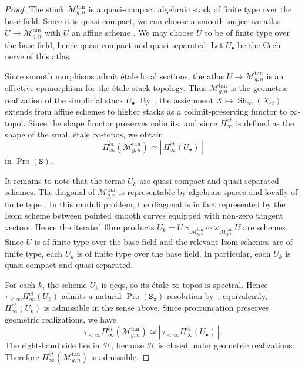 \documentclass{amsart}
\newcommand{\isSet}{\mathtt{S}}
\newcommand{\Pro}{\operatorname{Pro}}
\theoremstyle{definition}
\numberwithin{equation}{section}
\begin{document}
\begin{proof}
The stack $\mathcal M_{g,n}^{\tan}$ is a quasi-compact algebraic stack of finite type over the base field. Since it is quasi-compact, we can choose a smooth surjective atlas $U\to \mathcal M_{g,n}^{\tan}$ with $U$ an affine scheme \cite[\href{https://stacks.math.columbia.edu/tag/04YC}{04YC}]{stacks-project}. We may choose $U$ to be of finite type over the base field, hence quasi-compact and quasi-separated. Let $U_\bullet$ be the Cech nerve of this atlas.

Since smooth morphisms admit étale local sections, the atlas $U\to \mathcal M_{g,n}^{\tan}$ is an effective epimorphism for the étale stack topology. Thus $\mathcal M_{g,n}^{\tan}$ is the geometric realization of the simplicial stack $U_\bullet$. By~\cite[Lemma~2.26]{Carchedi}, the assignment $X\mapsto \operatorname{Sh}_\infty(X_{\acute et})$ extends from affine schemes to higher stacks as a colimit-preserving functor to $\infty$-topoi. Since the shape functor preserves colimits, and since $\Pi_\infty^{\acute et}$ is defined as the shape of the small étale $\infty$-topos, we obtain
\[
\Pi_\infty^{\acute et}(\mathcal M_{g,n}^{\tan})
\simeq
\left|\,\Pi_\infty^{\acute et}(U_\bullet)\,\right|
\]
in $\Pro(\isSet)$.

It remains to note that the terms $U_k$ are quasi-compact and quasi-separated schemes. The diagonal of $\mathcal M_{g,n}^{\tan}$ is representable by algebraic spaces and locally of finite type \cite[\href{https://stacks.math.columbia.edu/tag/04XS}{04XS}]{stacks-project}. In this moduli problem, the diagonal is in fact represented by the Isom scheme between pointed smooth curves equipped with non-zero tangent vectors. Hence the iterated fibre products
$U_k=U\times_{\mathcal M_{g,n}^{\tan}}\cdots\times_{\mathcal M_{g,n}^{\tan}}U$
are schemes. Since $U$ is of finite type over the base field and the relevant Isom schemes are of finite type, each $U_k$ is of finite type over the base field. In particular, each $U_k$ is quasi-compact and quasi-separated.

For each $k$, the scheme $U_k$ is qcqs, so its étale $\infty$-topos is spectral. Hence $\tau_{<\infty}\Pi_\infty^{\acute et}(U_k)$ admits a natural $\Pro(\isSet_\pi)$-resolution by~\cite[Example~A.9]{haine2024profinite}; equivalently, $\Pi_\infty^{\acute et}(U_k)$ is admissible in the sense above. Since protruncation preserves geometric realizations, we have
\[
\tau_{<\infty}\Pi_\infty^{\acute et}(\mathcal M_{g,n}^{\tan})
\simeq
\left|\,\tau_{<\infty}\Pi_\infty^{\acute et}(U_\bullet)\,\right|.
\]
The right-hand side lies in $\mathcal H$, because $\mathcal H$ is closed under geometric realizations. Therefore $\Pi_\infty^{\acute et}(\mathcal M_{g,n}^{\tan})$ is admissible.
\end{proof}
\end{document}
